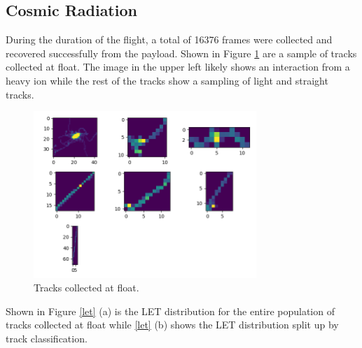 \subsection{Cosmic Radiation}
\label{sec:Cosmic-Radiation-Results}

During the duration of the flight, a total of 16376 frames were collected and recovered successfully from the payload. Shown in Figure \ref{tracks} are a sample of tracks collected at float. The image in the upper left likely shows an interaction from a heavy ion while the rest of the tracks show a sampling of light and straight tracks. 


\begin{figure}[H]
	\begin{center}
	\includegraphics[width=0.75\textwidth]{figures/tracks.png}
	\caption{Tracks collected at float.}
	\label{tracks}
	\end{center}
\end{figure}

Shown in Figure \ref{let} (a) is the LET distribution for the entire population of tracks collected at float while \ref{let} (b) shows the LET distribution split up by track classification.


